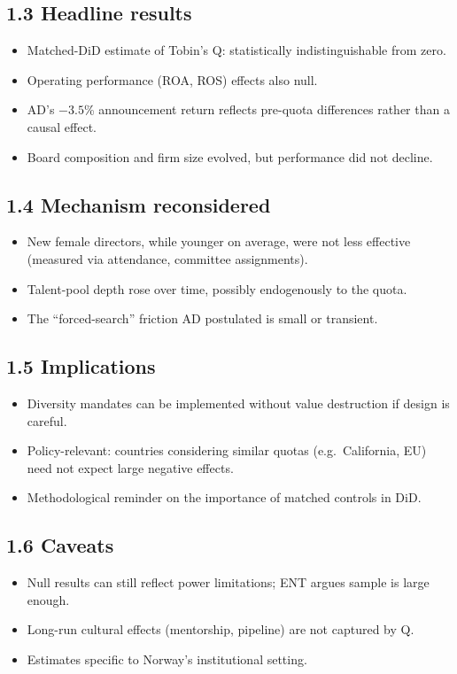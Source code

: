 \documentclass[11pt]{article}
\begin{document}
\subsection*{1.3 Headline results}
\begin{itemize}
\item Matched-DiD estimate of Tobin's Q: statistically indistinguishable from zero.
\item Operating performance (ROA, ROS) effects also null.
\item AD's $-3.5$\% announcement return reflects pre-quota differences rather than a causal effect.
\item Board composition and firm size evolved, but performance did not decline.
\end{itemize}

\subsection*{1.4 Mechanism reconsidered}
\begin{itemize}
\item New female directors, while younger on average, were not less effective (measured via attendance, committee assignments).
\item Talent-pool depth rose over time, possibly endogenously to the quota.
\item The ``forced-search'' friction AD postulated is small or transient.
\end{itemize}

\subsection*{1.5 Implications}
\begin{itemize}
\item Diversity mandates can be implemented without value destruction if design is careful.
\item Policy-relevant: countries considering similar quotas (e.g.\ California, EU) need not expect large negative effects.
\item Methodological reminder on the importance of matched controls in DiD.
\end{itemize}

\subsection*{1.6 Caveats}
\begin{alertbox}
\begin{itemize}
\item Null results can still reflect power limitations; ENT argues sample is large enough.
\item Long-run cultural effects (mentorship, pipeline) are not captured by Q.
\item Estimates specific to Norway's institutional setting.
\end{itemize}
\end{alertbox}
\end{document}
